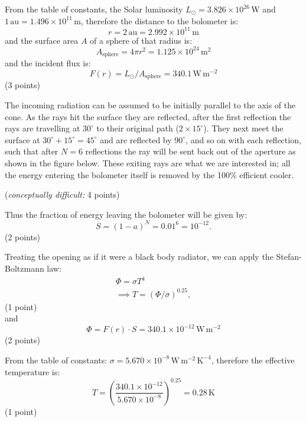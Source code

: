 From the table of constants, the Solar luminosity
$L_\odot = 3.826 \times 10^{26}$\,W and
$1\,\mathrm{au} = 1.496 \times 10^{11}$\,m, therefore the distance to the
bolometer is:
\[ r = 2\,\mathrm{au} = 2.992 \times 10^{11}\,\mathrm{m} \]
and the surface area $A$ of a sphere of that radius is:
\[ A_{\mathrm{sphere}} = 4\pi r^2 = 1.125 \times 10^{24}\,\mathrm{m}^2 \]
and the incident flux is:
\[ F(r) = L_\odot/A_{\mathrm{sphere}} = 340.1\,\mathrm{W\,m^{-2}} \]
\hfill(3 points)

The incoming radiation can be assumed to be initially parallel to the axis of
the cone. As the rays hit the surface they are reflected, after the first
reflection the rays are travelling at $30^\circ$ to their original path
($2 \times 15^\circ$). They next meet the surface at
$30^\circ + 15^\circ = 45^\circ$ and are reflected by $90^\circ$, and so on
with each reflection, such that after $N = 6$ reflections the ray will be
sent back out of the aperture as shown in the figure below. These exiting
rays are what we are interested in; all the energy entering the bolometer
itself is removed by the 100\% efficient cooler.


\hfill(\emph{conceptually difficult:} 4 points)

Thus the fraction of energy leaving the bolometer will be given by:
\[ S = (1-a)^N = 0.01^6 = 10^{-12}. \]
\hfill(2 points)

Treating the opening as if it were a black body radiator, we can apply the
Stefan-Boltzmann law:
\begin{gather*}
\Phi = \sigma T^4 \\
\implies T = (\Phi/\sigma)^{0.25},
\end{gather*}
\hfill(1 point)\\
and
\[ \Phi = F(r) \cdot S = 340.1 \times 10^{-12}\,\mathrm{W\,m^{-2}} \]
\hfill(2 points)

From the table of constants:
$\sigma = 5.670 \times 10^{-8}\,\mathrm{W\,m^{-2}\,K^{-4}}$, therefore the
effective temperature is:
\[ T = \left(\frac{340.1 \times 10^{-12}}{5.670 \times 10^{-8}}\right)^{0.25}
     = 0.28\,\mathrm{K} \]
\hfill(1 point)
